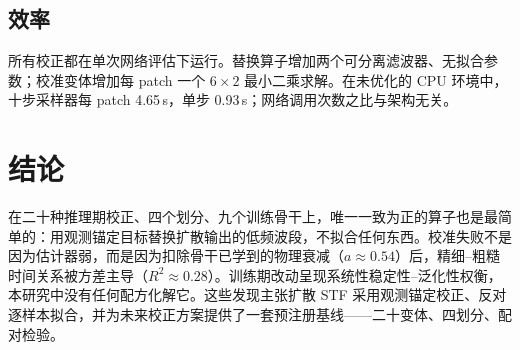 \documentclass{article}
\begin{document}
\subsection{效率}
所有校正都在单次网络评估下运行。替换算子增加两个可分离滤波器、无拟合参数；校准变体增加每 patch 一个 $6\times2$ 最小二乘求解。在未优化的 CPU 环境中，十步采样器每 patch 4.65\,s，单步 0.93\,s；网络调用次数之比与架构无关。

\section{结论}
\label{sec:concl}
在二十种推理期校正、四个划分、九个训练骨干上，唯一一致为正的算子也是最简单的：用观测锚定目标替换扩散输出的低频波段，不拟合任何东西。校准失败不是因为估计器弱，而是因为扣除骨干已学到的物理衰减（$a\approx0.54$）后，精细–粗糙时间关系被方差主导（$R^2\approx0.28$）。训练期改动呈现系统性稳定性–泛化性权衡，本研究中没有任何配方化解它。这些发现主张扩散 STF 采用观测锚定校正、反对逐样本拟合，并为未来校正方案提供了一套预注册基线——二十变体、四划分、配对检验。

\vfill\pagebreak


\end{document}
